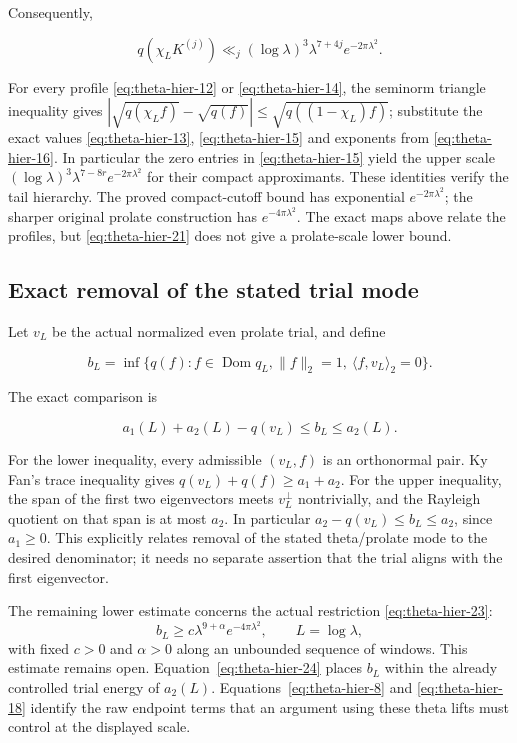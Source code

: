 Consequently,

\begin{equation}
q(\chi_L K^{(j)})\ll_j
      (\log\lambda)^3\lambda^{7+4j}e^{-2\pi\lambda^2}.
 \label{eq:theta-hier-22}
\end{equation}

For every profile \eqref{eq:theta-hier-12} or \eqref{eq:theta-hier-14}, the seminorm triangle inequality gives
$|\sqrt{q(\chi_L f)}-\sqrt{q(f)}|\le\sqrt{q((1-\chi_L)f)}$; substitute the exact values \eqref{eq:theta-hier-13}, \eqref{eq:theta-hier-15} and exponents from \eqref{eq:theta-hier-16}. In particular the zero entries in \eqref{eq:theta-hier-15} yield the upper scale
$(\log\lambda)^3\lambda^{7-8r}e^{-2\pi\lambda^2}$ for their compact approximants. These identities verify the tail hierarchy. The proved compact-cutoff bound has exponential $e^{-2\pi\lambda^2}$; the sharper original prolate construction has $e^{-4\pi\lambda^2}$. The exact maps above relate the profiles, but \eqref{eq:theta-hier-21} does not give a prolate-scale lower bound.

\subsection{Exact removal of the stated trial mode}

Let $v_L$ be the actual normalized even prolate trial, and define

\begin{equation}
b_L=\inf\{q(f):f\in\operatorname{Dom}q_L,
       \|f\|_2=1,\ \langle f,v_L\rangle_2=0\}.
 \label{eq:theta-hier-23}
\end{equation}

The exact comparison is

\begin{equation}
a_1(L)+a_2(L)-q(v_L)\le b_L\le a_2(L).
 \label{eq:theta-hier-24}
\end{equation}

For the lower inequality, every admissible $(v_L,f)$ is an orthonormal pair. Ky Fan's trace inequality gives $q(v_L)+q(f)\ge a_1+a_2$. For the upper inequality, the span of the first two eigenvectors meets $v_L^\perp$ nontrivially, and the Rayleigh quotient on that span is at most $a_2$. In particular $a_2-q(v_L)\le b_L\le a_2$, since $a_1\ge0$. This explicitly relates removal of the stated theta/prolate mode to the desired denominator; it needs no separate assertion that the trial aligns with the first eigenvector.

The remaining lower estimate concerns the actual restriction
\eqref{eq:theta-hier-23}:
\[
 b_L\ge c\lambda^{9+\alpha}e^{-4\pi\lambda^2},
 \qquad L=\log\lambda,
\]
with fixed $c>0$ and $\alpha>0$ along an unbounded sequence of
windows.  This estimate remains open.  Equation~\eqref{eq:theta-hier-24}
places $b_L$ within the already controlled trial energy of $a_2(L)$.
Equations~\eqref{eq:theta-hier-8} and \eqref{eq:theta-hier-18} identify
the raw endpoint terms that an argument using these theta lifts must
control at the displayed scale.
